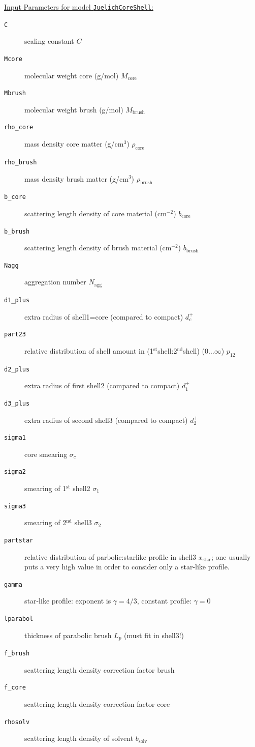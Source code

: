 \vspace{5mm}
\noindent \uline{Input Parameters for model \texttt{JuelichCoreShell}:}
\begin{description}
\item[\texttt{C}] scaling constant $C$
\item[\texttt{Mcore}] molecular weight core (g/mol) $M_\text{core}$
\item[\texttt{Mbrush}] molecular weight brush (g/mol) $M_\text{brush}$
\item[\texttt{rho\_core}] mass density core matter (g/cm$^3$) $\rho_\text{core}$
\item[\texttt{rho\_brush}] mass density brush matter (g/cm$^3$) $\rho_\text{brush}$
\item[\texttt{b\_core}] scattering length density of core material (cm$^{-2}$) $b_\text{core}$
\item[\texttt{b\_brush}] scattering length density of brush material (cm$^{-2}$) $b_\text{brush}$
\item[\texttt{Nagg}] aggregation number $N_\text{agg}$
\item[\texttt{d1\_plus}] extra radius of shell1=core (compared to compact) $d_c^+$
\item[\texttt{part23}] relative distribution of shell amount in
                (1$^\text{st}$shell:2$^\text{nd}$shell) ($0\ldots\infty$) $p_{12}$
\item[\texttt{d2\_plus}] extra radius of first shell2 (compared to compact) $d_1^+$
\item[\texttt{d3\_plus}] extra radius of second shell3 (compared to compact) $d_2^+$
\item[\texttt{sigma1}] core smearing $\sigma_c$
\item[\texttt{sigma2}] smearing of 1$^\text{st}$ shell2 $\sigma_1$
\item[\texttt{sigma3}] smearing of 2$^\text{nd}$ shell3 $\sigma_2$
\item[\texttt{partstar}] relative distribution of parbolic:starlike profile in shell3 $x_\text{star}$;
        one usually puts a very high value in order to consider only a star-like profile.
\item[\texttt{gamma}] star-like profile: exponent is $\gamma=4/3$, constant profile: $\gamma=0$
\item[\texttt{lparabol}] thickness of parabolic brush $L_p$ (must fit in shell3!)
\item[\texttt{f\_brush}] scattering length density correction factor brush
\item[\texttt{f\_core}] scattering length density correction factor core
\item[\texttt{rhosolv}] scattering length density of solvent $b_\textrm{solv}$
\end{description}

